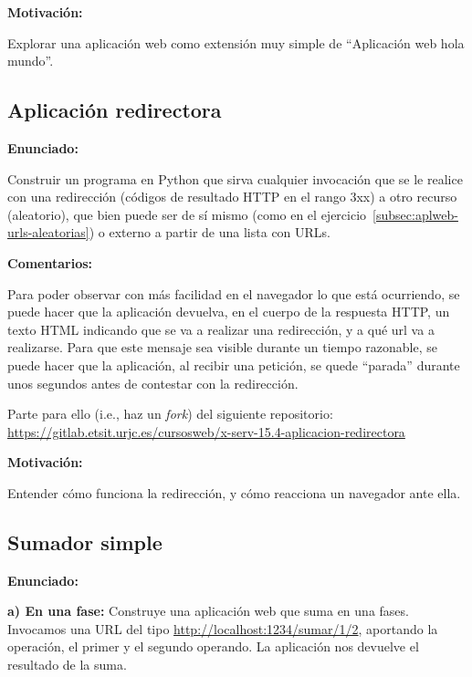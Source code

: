 \textbf{Motivación:}

Explorar una aplicación web como extensión muy simple de ``Aplicación web hola mundo''.

\subsection{Aplicación redirectora}
\label{subsec:aplweb-redirectora}

\textbf{Enunciado:}

Construir un programa en Python que sirva cualquier invocación que se le realice con una redirección (códigos de resultado HTTP en el rango 3xx) a otro recurso (aleatorio), que bien puede ser de sí mismo (como en el ejercicio~\ref{subsec:aplweb-urls-aleatorias}) o externo a partir de una lista con URLs.

\textbf{Comentarios:}

Para poder observar con más facilidad en el navegador lo que está ocurriendo, se puede hacer que la aplicación devuelva, en el cuerpo de la respuesta HTTP, un texto HTML indicando que se va a realizar una redirección, y a qué url va a realizarse. Para que este mensaje sea visible durante un tiempo razonable, se puede hacer que la aplicación, al recibir una petición, se quede ``parada'' durante unos segundos antes de contestar con la redirección.

Parte para ello (i.e., haz un \emph{fork}) del siguiente repositorio: \url{https://gitlab.etsit.urjc.es/cursosweb/x-serv-15.4-aplicacion-redirectora}


\textbf{Motivación:}

Entender cómo funciona la redirección, y cómo reacciona un navegador ante ella.

\subsection{Sumador simple}
\label{subsec:sumador-simple}

\textbf{Enunciado:}

{\bf a) En una fase:} Construye una aplicación web que suma en una fases. Invocamos una URL del tipo \url{http://localhost:1234/sumar/1/2}, aportando la operación, el primer y el segundo operando. La aplicación nos devuelve el resultado de la suma.

